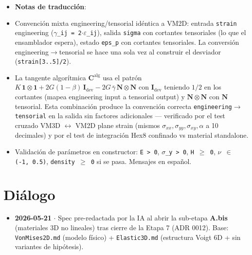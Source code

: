 \documentclass[11pt,letterpaper,oneside]{report}
\begin{document}
\begin{itemize}
  \item \textbf{Notas de traducción}:
  \item Convención mixta engineering/tensorial idéntica a VM2D: entrada \texttt{strain} engineering (\texttt{\ensuremath{\gamma}\_ij = 2\ensuremath{\cdot}\ensuremath{\varepsilon}\_ij}), salida \texttt{sigma} con cortantes tensoriales (lo que el ensamblador espera), estado \texttt{eps\_p} con cortantes tensoriales. La conversión engineering\ensuremath{\to}tensorial se hace una sola vez al construir el desviador (\texttt{strain[3..5]/2}).
  \item La tangente algorítmica $\mathbf C^\text{alg}$ usa el patrón $K\,\mathbf 1\otimes\mathbf 1 + 2G(1-\beta)\,\mathbf I_\text{dev} - 2G\,\bar\gamma\,\mathbf N\otimes\mathbf N$ con $\mathbf I_\text{dev}$ teniendo $1/2$ en los cortantes (mapea engineering input a tensorial output) y $\mathbf N\otimes\mathbf N$ con $\mathbf N$ tensorial. Esta combinación produce la convención correcta \texttt{engineering\ensuremath{\to}tensorial} en la salida sin factores adicionales --- verificado por el test cruzado VM3D \ensuremath{\leftrightarrow} VM2D plane strain (mismos $\sigma_{xx}, \sigma_{yy}, \sigma_{xy}, \alpha$ a 10 decimales) y por el test de integración Hex8 confinado vs material standalone.
  \item Validación de parámetros en constructor: \texttt{E > 0}, \texttt{\ensuremath{\sigma}\_y > 0}, \texttt{H \ensuremath{\ge} 0}, \texttt{\ensuremath{\nu} \ensuremath{\in} (-1, 0.5)}, \texttt{density \ensuremath{\ge} 0} si se pasa. Mensajes en español.
\end{itemize}


\section{Diálogo}

\begin{itemize}
  \item \textbf{2026-05-21} \ensuremath{\cdot} Spec pre-redactada por la IA al abrir la sub-etapa \textbf{A.bis} (materiales 3D no lineales) tras cierre de la Etapa 7 (ADR 0012). Base: \texttt{VonMises2D.md} (modelo físico) + \texttt{Elastic3D.md} (estructura Voigt 6D + sin variantes de hipótesis).
\end{itemize}
\end{document}
